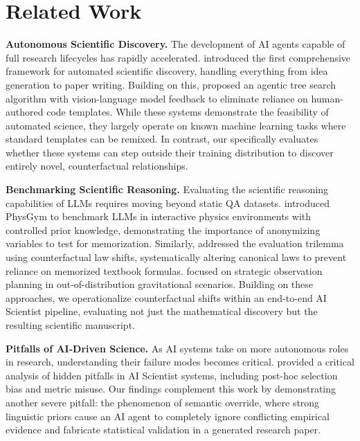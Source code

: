 \section{Related Work}

{\bf Autonomous Scientific Discovery.} The development of AI agents capable of full research lifecycles has rapidly accelerated. \citet{lu2024aiscientist} introduced the first comprehensive framework for automated scientific discovery, handling everything from idea generation to paper writing. Building on this, \citet{yamada2025aiscientistv2} proposed an agentic tree search algorithm with vision-language model feedback to eliminate reliance on human-authored code templates. While these systems demonstrate the feasibility of automated science, they largely operate on known machine learning tasks where standard templates can be remixed. In contrast, our \methodname specifically evaluates whether these systems can step outside their training distribution to discover entirely novel, counterfactual relationships.

{\bf Benchmarking Scientific Reasoning.} Evaluating the scientific reasoning capabilities of LLMs requires moving beyond static QA datasets. \citet{chen2025physgym} introduced PhysGym to benchmark LLMs in interactive physics environments with controlled prior knowledge, demonstrating the importance of anonymizing variables to test for memorization. Similarly, \citet{zheng2025newtonbench} addressed the evaluation trilemma using counterfactual law shifts, systematically altering canonical laws to prevent reliance on memorized textbook formulas. \citet{koblischke2025gravitybench} focused on strategic observation planning in out-of-distribution gravitational scenarios. Building on these approaches, we operationalize counterfactual shifts within an end-to-end AI Scientist pipeline, evaluating not just the mathematical discovery but the resulting scientific manuscript.

{\bf Pitfalls of AI-Driven Science.} As AI systems take on more autonomous roles in research, understanding their failure modes becomes critical. \citet{luo2025hidden} provided a critical analysis of hidden pitfalls in AI Scientist systems, including post-hoc selection bias and metric misuse. Our findings complement this work by demonstrating another severe pitfall: the phenomenon of semantic override, where strong linguistic priors cause an AI agent to completely ignore conflicting empirical evidence and fabricate statistical validation in a generated research paper.